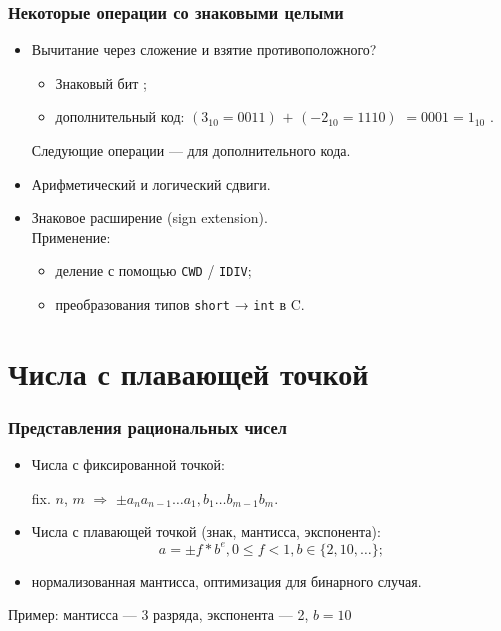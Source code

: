 \begin{frame}
\frametitle{Некоторые операции со знаковыми целыми}
\begin{itemize}
    \item Вычитание через сложение и взятие противоположного?
        \begin{itemize}
            \pause\item Знаковый бит \pause{\LARGE  \Frowny{}}; %
            \pause\item дополнительный код\pause:
            $(3_{10}=0011)$ $+$ $(-2_{10}=1110)$ \pause $= 0001 = 1_{10}$ \pause{\LARGE  \Smiley{}}.  %
        \end{itemize}
        \pause Следующие операции­ — для дополнительного кода.
    \pause\item Арифметический и логический сдвиги.
    \pause\item Знаковое расширение (sign extension). \\
        \pause Применение:
        \begin{itemize}
            \pause\item деление с помощью \texttt{CWD} / \texttt{IDIV};
            \pause\item преобразования типов \texttt{short} → \texttt{int} в C.
        \end{itemize}
\end{itemize}
\end{frame}

\section{Числа с плавающей точкой}

\begin{frame}
\frametitle{Представления рациональных чисел}
\begin{itemize}
    \pause\item Числа с фиксированной точкой:\\
    \begin{center}
    fix. $n$, $m$ $\Rightarrow$
    $\pm a_n a_{n-1} \ldots a_1 , b_1 \ldots b_{m-1} b_m$.
	\end{center}

    \pause\item Числа с плавающей точкой (знак, мантисса, экспонента):
    \[
        a = \pm f * b^{e}, 0 \leqslant f < 1, b\in \{2,10, \ldots\} ;
    \]

    \pause\item нормализованная мантисса\pause, оптимизация для бинарного случая.
\end{itemize}

\pause
\begin{block}{Пример: мантисса — 3 разряда, экспонента — 2, $b=10$}


\end{block}


\end{frame}

